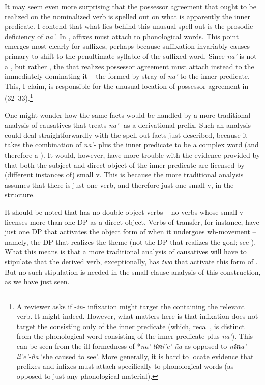 \documentclass[output=paper,
modfonts
]{LSP/langsci}
\begin{document}
\begin{exe}
\begin{xlist}
It may seem even more surprising that the possessor agreement that ought
to be realized on the nominalized verb is spelled out on what is
apparently the inner predicate. I contend that what lies behind this
unusual spell-out is the prosodic deficiency of \emph{na'}. In ,
affixes must attach to phonological words. This point emerges most
clearly for suffixes, perhaps because suffixation invariably causes
primary  to shift to the penultimate syllable of the suffixed
word. Since \emph{na'} is not a , but rather
, the  that realizes possessor agreement
must attach instead to the  immediately dominating
it -- the  formed by stray  of \emph{na'} to
the inner predicate. This, I claim, is responsible for the unusual
location of possessor agreement in (32--33).\footnote{A reviewer asks if
  -\emph{in}- infixation might target the  containing
  the relevant verb. It might indeed. However, what matters here is that
  infixation does not target the  consisting only of
  the inner predicate (which, recall, is distinct from the phonological
  word consisting of the inner predicate plus \emph{na'}). This can be
  seen from the ill-formedness of *\emph{na'-l\textbf{in}i'e'-ña} as
  opposed to \emph{n\textbf{in}a'-li'e'-ña} `she caused to see'. More
  generally, it is hard to locate  evidence that prefixes and
  infixes must attach specifically to phonological words (as opposed to
  just any phonological material).}

One might wonder how the same facts would be handled by a more
traditional analysis of  causatives that treats \emph{na'-} as a
derivational prefix. Such an analysis could deal straightforwardly with
the spell-out facts just described, because it takes the combination of
\emph{na'}- plus the inner predicate to be a complex word (and therefore
a ). It would, however, have more trouble with the
evidence provided by  that both the subject and direct
object of the inner predicate are licensed by (different instances of)
small v. This is because the more traditional analysis assumes that
there is just one verb, and therefore just one small v, in the
structure.

It should be noted that  has no double object verbs -- no verbs
whose small v licenses more than one DP as a direct object. Verbs of
transfer, for instance, have just one DP that activates the object form
of  when it undergoes wh-movement -- namely, the DP that
realizes the theme (not the DP that realizes the goal; see \citealt[161--163]{gibson1980}). What this means is that a more traditional analysis of
 causatives will have to stipulate that the derived 
verb, exceptionally, has \emph{two}  that activate this form of
. But no such stipulation is needed in the small clause
analysis of this construction, as we have just seen.


\end{xlist}
\end{exe}
\end{document}
